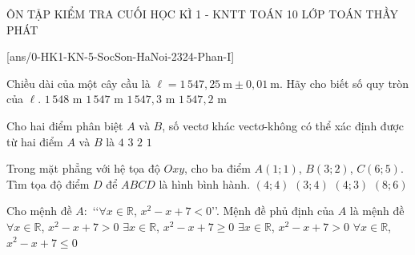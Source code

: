 \begin{name}
	{ÔN TẬP KIỂM TRA CUỐI HỌC KÌ 1 - KNTT}
	{TOÁN 10}
	{LỚP TOÁN THẦY PHÁT}
	{\thoigian}
\end{name}

\caulc
{}[ans/0-HK1-KN-5-SocSon-HaNoi-2324-Phan-I]
\setcounter{ex}{0}

\begin{ex}%
	Chiều dài của một cây cầu là $\ell=1\,547{,}25\mathrm{~m}\pm 0{,}01\mathrm{~m}$. Hãy cho biết số quy tròn của $\ell$.
	\choice
	{$1\,548$ m}
	{$1\,547$ m}
	{\True $1\,547{,}3$ m}
	{$1\,547{,}2$ m}
\end{ex}
\begin{ex}%
	Cho hai điểm phân biệt $A$ và $B$, số vectơ khác vectơ-không có thể xác định được từ hai điểm $A$ và $B$ là
	\choice
	{$4$}
	{$3$}
	{\True $2$}
	{$1$}
\end{ex}
\begin{ex}%
	Trong mặt phẳng với hệ tọa độ $Oxy$, cho ba điểm $A(1;1)$, $B(3;2)$, $C(6;5)$. Tìm tọa độ điểm $D$ để $ABCD$ là hình bình hành.
	\choice
	{\True $(4;4)$}
	{$(3;4)$}
	{$(4;3)$}
	{$(8;6)$}
\end{ex}
\begin{ex}%
	Cho mệnh đề $A\colon$ \lq\lq$\forall x\in\mathbb{R}$, $x^2-x+7<0$\rq\rq. Mệnh đề phủ định của $A$ là mệnh đề
	\choice
	{$\forall x\in\mathbb{R}$, $x^2-x+7>0$}
	{\True $\exists x\in\mathbb{R}$, $x^2-x+7\ge 0$}
	{$\exists x\in\mathbb{R}$, $x^2-x+7>0$}
	{$\forall x\in\mathbb{R}$, $x^2-x+7\le 0$}
\end{ex}
